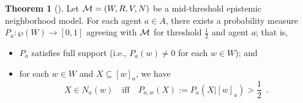 \documentclass[12pt]{article}
\theoremstyle{definition}
\newtheorem{theorem}{Theorem}[section]
\newcommand{\M}{{\cal M}}      %
\begin{document}
\begin{theorem}[\cite{Lenzen1980:gwuw}]
  \label{theorem:lenzen}
  Let $\M=(W,R,V,N)$ be a mid-threshold epistemic neighborhood model.
  For each agent $a\in A$, there exists a probability measure
  $P_a:\wp(W)\to[0,1]$ agreeing with $\M$ for threshold $\frac 12$ and
  agent $a$; that is,
  \begin{itemize}
  \item $P_a$ satisfies full support (i.e., $P_a(w)\neq0$ for each
    $w\in W$); and

  \item for each $w\in W$ and $X\subseteq[w]_a$, we have
    \[
    \textstyle X\in N_a(w) \quad\text{iff}\quad
    P_{a,w}(X):=P_a(X|[w]_a)>\frac 12\enspace.
    \]
  \end{itemize}
\end{theorem}
\end{document}
